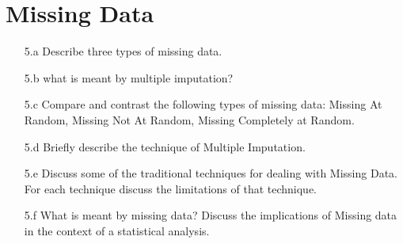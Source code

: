 \documentclass[a4paper,12pt]{article}
\begin{document}
\section*{Missing Data}

\begin{itemize}
\item[5.a] Describe three types of missing data.
\item[5.b] what is meant by multiple imputation?
\item[5.c] Compare and contrast the following types of missing data: Missing At Random, Missing
Not At Random, Missing Completely at Random.
\item[5.d]Briefly describe the technique of Multiple Imputation.
\item[5.e] Discuss some of the traditional techniques for dealing with Missing Data. For each technique discuss the limitations of that technique.
\item[5.f] What is meant by missing data? Discuss the implications of Missing data in the context of a statistical analysis.
\end{itemize}
\end{document}
